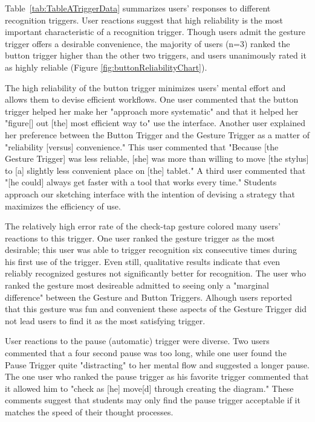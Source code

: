 \documentclass{egpubl}
\begin{document}
Table~\ref{tab:TableATriggerData} summarizes users' responses to
different recognition triggers.  User reactions suggest that high
reliability is the most important characteristic of a recognition
trigger.  Though users admit the gesture trigger offers a desirable
convenience, the majority of users (n=3) ranked the button trigger
higher than the other two triggers, and users unanimously rated it as
highly reliable (Figure \ref{fig:buttonReliabilityChart}).

The high reliability of the button trigger minimizes users' mental
effort and allows them to devise efficient workflows.  One user
commented that the button trigger helped her make her "approach more
systematic" and that it helped her "figure[] out [the] most efficient
way to" use the interface.  Another user explained her preference
between the Button Trigger and the Gesture Trigger as a matter of
"reliability [versus] convenience."  This user commented that "Because
[the Gesture Trigger] was less reliable, [she] was more than willing
to move [the stylus] to [a] slightly less convenient place on [the]
tablet."  A third user commented that "[he could] always get faster
with a tool that works every time."  Students approach our sketching
interface with the intention of devising a strategy that maximizes the
efficiency of use.  

The relatively high error rate of the check-tap gesture colored many
users' reactions to this trigger.  One user ranked the gesture trigger
as the most desirable; this user was able to trigger recognition
six consecutive times during his first use of the trigger.  Even
still, qualitative results indicate that even reliably recognized
gestures not significantly better for recognition.  The user who
ranked the gesture most desireable admitted to seeing only a "marginal
difference" between the Gesture and Button Triggers.  Alhough users
reported that this gesture was fun and convenient these aspects of the
Gesture Trigger did not lead users to find it as the most satisfying
trigger.

User reactions to the pause (automatic) trigger were diverse.  Two
users commented that a four second pause was too long, while one user
found the Pause Trigger quite "distracting" to her mental flow and
suggested a longer pause.  The one user who ranked the pause trigger
as his favorite trigger commented that it allowed him to "check as
[he] move[d] through creating the diagram."  These comments suggest
that students may only find the pause trigger acceptable if it matches
the speed of their thought processes. 
\end{document}

